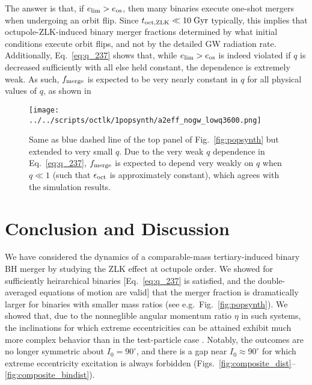 \documentclass[
        fleqn,
        usenatbib,
    ]{mnras}
\newlength{\colummwidth}
\begin{document}
The answer is that, if $e_{\lim} > e_{\rm os}$, then many binaries execute
one-shot mergers when undergoing an orbit flip. Since $t_{\rm oct,
ZLK} \ll 10\;\mathrm{Gyr}$ typically, this implies that octupole-ZLK-induced
binary merger fractions determined by what initial conditions execute orbit
flips, and not by the detailed GW radiation rate. Additionally,
Eq.~\eqref{eq:q_237} shows that, while $e_{\lim} > e_{\rm os}$ is indeed
violated if $q$ is decreased sufficiently with all else held constant, the
dependence is extremely weak. As such, $f_{\rm merge}$ is expected to be very
nearly constant in $q$ for all physical values of $q$, as shown in
\begin{figure}
    \centering
    \texttt{[image: ../../scripts/octlk/1popsynth/a2eff\_nogw\_lowq3600.png]}
    \caption{Same as blue dashed line of the top panel of
    Fig.~\ref{fig:popsynth} but extended to very small $q$. Due to the very weak
    $q$ dependence in Eq.~\eqref{eq:q_237}, $f_{\rm merge}$ is expected to
    depend very weakly on $q$ when $q \ll 1$ (such that $\epsilon_{\rm oct}$ is
    approximately constant), which agrees with the simulation
    results.}\label{fig:popsynth_lowq}
\end{figure}

\section{Conclusion and Discussion}

We have considered the dynamics of a comparable-mass tertiary-induced binary BH
merger by studying the ZLK effect at octupole order. We showed for sufficiently
heirarchical binaries [Eq.~\eqref{eq:q_237} is satisfied, and the
double-averaged equations of motion are valid] that the merger fraction is
dramatically larger for binaries with smaller mass ratios (see
e.g.\ Fig.~\ref{fig:popsynth}). We showed that, due to the nonneglible angular
momentum ratio $\eta$ in such systems, the inclinations for which extreme
eccentricities can be attained exhibit much more complex behavior than in the
test-particle case \citep[as studied by][]{katz2011long, lithwick2011eccentric,
LML15, MLL16}. Notably, the outcomes are no longer symmetric about $I_0 =
90^\circ$, and there is a gap near $I_0 \approx 90^\circ$ for which extreme
eccentricity excitation is always forbidden
(Figs.~\ref{fig:composite_dist}--\ref{fig:composite_bindist}).
\end{document}
